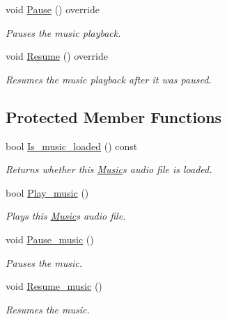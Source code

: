 \begin{DoxyCompactItemize}
void \hyperlink{classjetfuel_1_1media_1_1Music_a002f31a60671c229bd054539caf537c5}{Pause} () override
\begin{DoxyCompactList}\small\item\em Pauses the music playback. \end{DoxyCompactList}\item 
void \hyperlink{classjetfuel_1_1media_1_1Music_a0c8e12634e29cfe37138349776b6d9a8}{Resume} () override
\begin{DoxyCompactList}\small\item\em Resumes the music playback after it was paused. \end{DoxyCompactList}\end{DoxyCompactItemize}
\subsection*{Protected Member Functions}
\begin{DoxyCompactItemize}
\item 
bool \hyperlink{classjetfuel_1_1media_1_1Music_ac665232356b8b316790e46a3423c158a}{Is\+\_\+music\+\_\+loaded} () const
\begin{DoxyCompactList}\small\item\em Returns whether this \hyperlink{classjetfuel_1_1media_1_1Music}{Music}\textquotesingle{}s audio file is loaded. \end{DoxyCompactList}\item 
bool \hyperlink{classjetfuel_1_1media_1_1Music_a298ce99e6d22e199d1642c21fd18a672}{Play\+\_\+music} ()
\begin{DoxyCompactList}\small\item\em Plays this \hyperlink{classjetfuel_1_1media_1_1Music}{Music}\textquotesingle{}s audio file. \end{DoxyCompactList}\item 
void \hyperlink{classjetfuel_1_1media_1_1Music_a16f346ddd22ce93c347f53f2f930d3fe}{Pause\+\_\+music} ()
\begin{DoxyCompactList}\small\item\em Pauses the music. \end{DoxyCompactList}\item 
void \hyperlink{classjetfuel_1_1media_1_1Music_a390925626dcd2531d1b287f0bfb401fd}{Resume\+\_\+music} ()
\begin{DoxyCompactList}\small\item\em Resumes the music. \end{DoxyCompactList}\end{DoxyCompactItemize}


